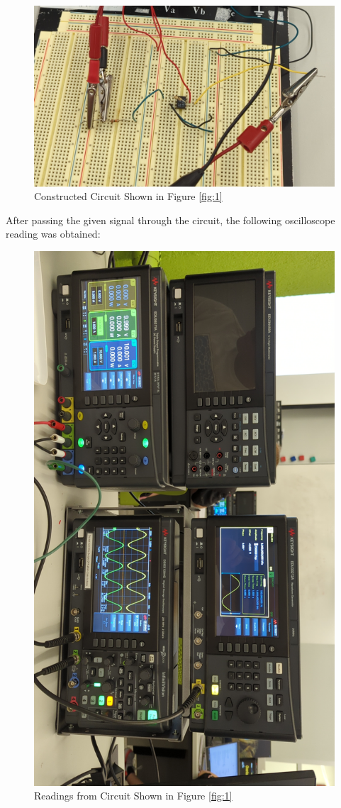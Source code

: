 \documentclass[
	letterpaper, %
	10pt, %
]{CSUniSchoolLabReport}
\begin{document}
\begin{figure}[H]
  \centering
  \includegraphics[width=.7\textwidth]{Figures/L1F1.jpg}
  \caption{Constructed Circuit Shown in Figure \ref{fig:1}}
  \label{fig:2}
\end{figure}

After passing the given signal through the circuit, the following oscilloscope reading was obtained:

\begin{figure}[H]
  \centering
  \includegraphics[width=.9\textwidth]{Figures/L1F2.jpg}
  \caption{Readings from Circuit Shown in Figure \ref{fig:1}}
  \label{fig:3}
\end{figure}
\end{document}
